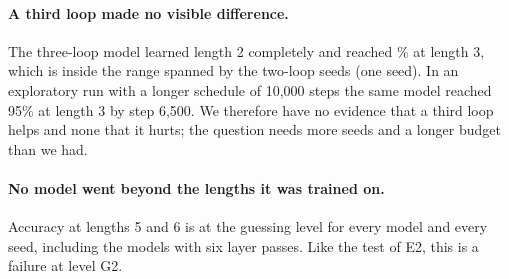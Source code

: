 \paragraph{A third loop made no visible difference.}
The three-loop model learned length 2 completely and reached \EThreeTiedTwoXThreeDepthThree\% at length 3, which is inside the range spanned by the two-loop seeds (one seed).
In an exploratory run with a longer schedule of 10{,}000 steps the same model reached 95\% at length 3 by step 6{,}500.
We therefore have no evidence that a third loop helps and none that it hurts; the question needs more seeds and a longer budget than we had.

\paragraph{No model went beyond the lengths it was trained on.}
Accuracy at lengths 5 and 6 is at the guessing level for every model and every seed, including the models with six layer passes.
Like the  test of E2, this is a failure at level G2.
